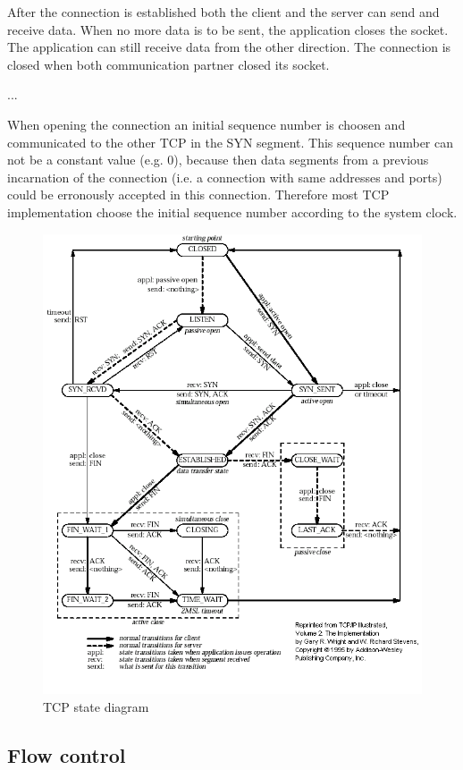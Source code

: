After the connection is established both the client and the server can send and receive data.
When no more data is to be sent, the application closes the socket. The application can still
receive data from the other direction. The connection is closed when both communication partner
closed its socket.

...

When opening the connection an initial sequence number is choosen and communicated to the
other TCP in the SYN segment. This sequence number can not be a constant value (e.g. 0),
because then data segments from a previous incarnation of the connection (i.e. a connection
with same addresses and ports) could be erronously accepted in this connection. Therefore
most TCP implementation choose the initial sequence number according to the system clock.


\begin{figure}
\includegraphics[width=\textwidth]{figures/tcpstate}
\caption{TCP state diagram}
\label{fig:tcp_states}
\end{figure}

\subsection{Flow control}
\label{subsec:flow_control}

